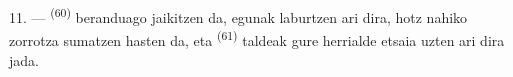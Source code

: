 11. ---  \textsuperscript{(60)} beranduago jaikitzen da, egunak
laburtzen ari dira,  hotz nahiko zorrotza sumatzen hasten da, eta
 \textsuperscript{(61)} taldeak gure herrialde etsaia uzten ari
dira jada.
\VUsaut{6.0mm}
\VUfilet{22mm}
